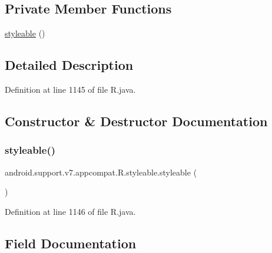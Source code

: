 \subsection*{Private Member Functions}
\begin{DoxyCompactItemize}
\item 
\mbox{\hyperlink{classandroid_1_1support_1_1v7_1_1appcompat_1_1_r_1_1styleable_a073eb38838bc7119b3e0a4c46f1263f6}{styleable}} ()
\end{DoxyCompactItemize}


\subsection{Detailed Description}


Definition at line 1145 of file R.\+java.



\subsection{Constructor \& Destructor Documentation}
\mbox{\label{classandroid_1_1support_1_1v7_1_1appcompat_1_1_r_1_1styleable_a073eb38838bc7119b3e0a4c46f1263f6}} 
\subsubsection{\texorpdfstring{styleable()}{styleable()}}
{\footnotesize\ttfamily android.\+support.\+v7.\+appcompat.\+R.\+styleable.\+styleable (\begin{DoxyParamCaption}{ }\end{DoxyParamCaption})\hspace{0.3cm}{\ttfamily [private]}}



Definition at line 1146 of file R.\+java.


\begin{DoxyCode}{0}

\end{DoxyCode}


\subsection{Field Documentation}
\mbox{\label{classandroid_1_1support_1_1v7_1_1appcompat_1_1_r_1_1styleable_a5941dc15714398e9ec9afaa0155cc1cf}} 
